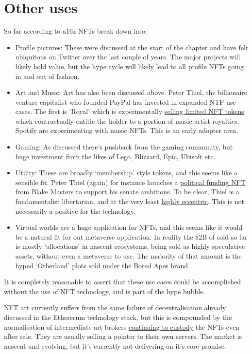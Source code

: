 \section{Other uses}
So far according to a16z NFTs break down into:
\begin{itemize}
\item Profile pictures: These were discussed at the start of the chapter and have felt ubiquitous on Twitter over the last couple of years. The major projects will likely hold value, but the hype cycle will likely lead to all profile NFTs going in and out of fashion.
\item Art and Music: Art has also been discussed above. Peter Thiel, the billionaire venture capitalist who founded PayPal has invested in expanded NTF use cases. The first is `Royal' which is experimentally \href{https://royal.io/}{selling limited NFT tokens} which contractually entitle the holder to a portion of music artist royalties. Spotify are experimenting with music NFTs. This is an early adopter area.
\item Gaming: As discussed there's pushback from the gaming community, but huge investment from the likes of Lego, Blizzard, Epic, Ubisoft etc.
\item Utility: These are broadly `membership' style tokens, and this seems like a sensible fit. Peter Thiel (again) for instance launches a \href{https://www.ztonft.com/}{political funding NFT} from Blake Masters to support his senate ambitions. To be clear, Thiel is a fundamentalist libertarian, and at the very least \href{https://gizmodo.com/peter-thiel-bitcoin-talk-miami-2022-1848764790}{highly eccentric}. This is not necessarily a positive for the technology.
\item Virtual worlds are a huge application for NFTs, and this seems like it would be a natural fit for out metaverse application. In reality the \$2B of sold so far is mostly `allocations' in nascent ecosystems, being sold as highly speculative assets, without even a metaverse to use. The majority of that amount is the hyped `Otherland' plots sold under the Bored Apes brand.
\end{itemize}
It is completely reasonable to assert that these use cases could be accomplished without the use of NFT technology, and is part of the hype bubble.\par
NFT art currently suffers from the same failure of decentralisation already discussed in the Ethererum technology stack, but this is compounded by the normalisation of intermediate art brokers \href{https://moxie.org/2022/01/07/web3-first-impressions.html}{continuing to custody} the NFTs even after sale. They are usually selling a pointer to their own servers. The market is nascent and evolving, but it's currently not delivering on it's core promise.\par
